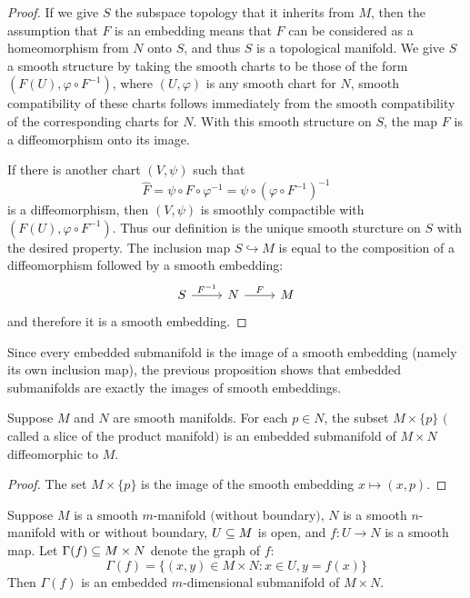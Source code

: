 \begin{proof}
If we give $S$ the subspace topology that it inherits from $M$, then the assumption
that $F$ is an embedding means that $F$ can be considered as a homeomorphism from $N$ onto $S$, and thus $S$ is a topological manifold. We give $S$ a smooth structure
by taking the smooth charts to be those of the form $(F(U),\varphi\circ F^{-1})$, where $(U,\varphi)$ is any smooth chart for $N$, smooth compatibility of these charts follows immediately from the smooth compatibility of the corresponding charts for $N$. With this smooth structure on $S$, the map $F$ is a diffeomorphism onto its image.\par 
If there is another chart $(V,\psi)$ such that
\[\widehat{F}=\psi\circ F\circ\varphi^{-1}=\psi\circ(\varphi\circ F^{-1})^{-1}\]
is a diffeomorphism, then $(V,\psi)$ is smoothly compactible with $(F(U),\varphi\circ F^{-1})$. Thus our definition is the unique smooth sturcture on $S$ with the desired property. The inclusion map $S\hookrightarrow M$ is equal to the composition of a diffeomorphism followed by a smooth embedding:
\[\begin{tikzcd}
S\ar[r,"F^{-1}"]&N\ar[r,"F"]&M
\end{tikzcd}\]
and therefore it is a smooth embedding.
\end{proof}
Since every embedded submanifold is the image of a smooth embedding (namely its own inclusion map), the previous proposition shows that embedded submanifolds are exactly the images of smooth embeddings.
\begin{proposition}
Suppose $M$ and $N$ are smooth manifolds. For each $p\in N$, the subset $M\times\{p\}$ $($called a slice of the product manifold$)$ is an embedded submanifold of $M\times N$ diffeomorphic to $M$.
\end{proposition}
\begin{proof}
The set $M\times\{p\}$ is the image of the smooth embedding $x\mapsto(x,p)$.
\end{proof}
\begin{proposition}\label{graph submani}
Suppose $M$ is a smooth $m$-manifold $($without boundary$)$, $N$ is a smooth $n$-manifold with or without boundary, $U\subseteq M$ is open, and $f:U\to N$ is a smooth map. Let $\Gamma(f)\subseteq M\times N$ denote the graph of $f$:
\[\Gamma(f)=\{(x,y)\in M\times N:x\in U,y=f(x)\}\]
Then $\Gamma(f)$ is an embedded $m$-dimensional submanifold of $M\times N$.
\end{proposition}

